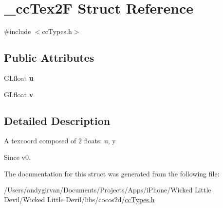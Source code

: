 \hypertarget{struct__cc_tex2_f}{\section{\-\_\-cc\-Tex2\-F Struct Reference}
\label{struct__cc_tex2_f}
}


{\ttfamily \#include $<$cc\-Types.\-h$>$}

\subsection*{Public Attributes}
\begin{DoxyCompactItemize}
\item 
\hypertarget{struct__cc_tex2_f_aa17e0fbd06953bbc01899e09615779b4}{G\-Lfloat {\bfseries u}}\label{struct__cc_tex2_f_aa17e0fbd06953bbc01899e09615779b4}

\item 
\hypertarget{struct__cc_tex2_f_af255ba5c7a2aa85dccc38a487f1d8c8b}{G\-Lfloat {\bfseries v}}\label{struct__cc_tex2_f_af255ba5c7a2aa85dccc38a487f1d8c8b}

\end{DoxyCompactItemize}


\subsection{Detailed Description}
A texcoord composed of 2 floats\-: u, y \begin{DoxySince}{Since}
v0. 
\end{DoxySince}


The documentation for this struct was generated from the following file\-:\begin{DoxyCompactItemize}
\item 
/\-Users/andygirvan/\-Documents/\-Projects/\-Apps/i\-Phone/\-Wicked Little Devil/\-Wicked Little Devil/libs/cocos2d/\hyperlink{cc_types_8h}{cc\-Types.\-h}\end{DoxyCompactItemize}
